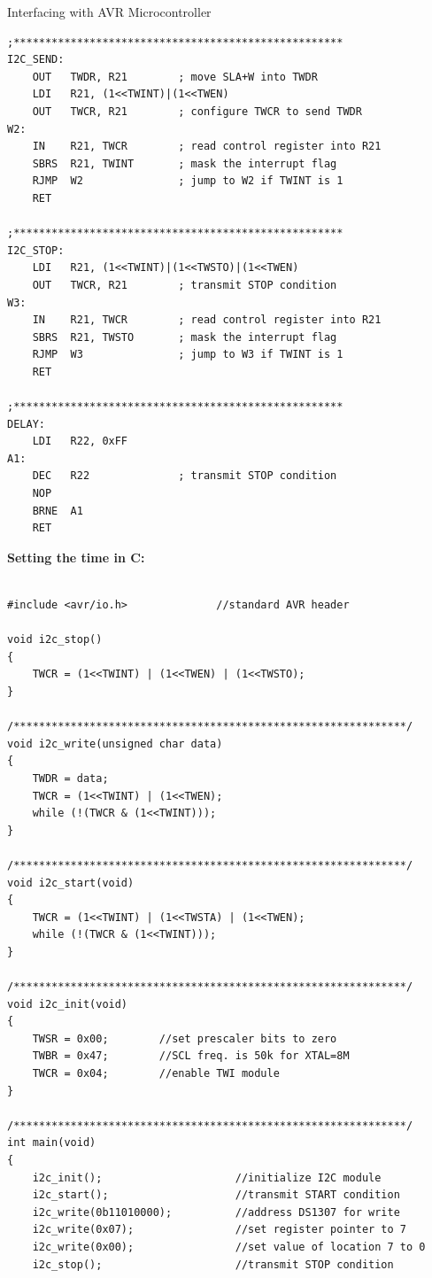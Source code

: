 \documentclass[11pt]{beamer}
\begin{document}
\begin{frame}{Interfacing with AVR Microcontroller}
\begin{verbatim}
;****************************************************
I2C_SEND:
    OUT   TWDR, R21        ; move SLA+W into TWDR
    LDI   R21, (1<<TWINT)|(1<<TWEN)
    OUT   TWCR, R21        ; configure TWCR to send TWDR
W2:
    IN    R21, TWCR        ; read control register into R21
    SBRS  R21, TWINT       ; mask the interrupt flag
    RJMP  W2               ; jump to W2 if TWINT is 1
    RET

;****************************************************
I2C_STOP:
    LDI   R21, (1<<TWINT)|(1<<TWSTO)|(1<<TWEN)
    OUT   TWCR, R21        ; transmit STOP condition
W3:
    IN    R21, TWCR        ; read control register into R21
    SBRS  R21, TWSTO       ; mask the interrupt flag
    RJMP  W3               ; jump to W3 if TWINT is 1
    RET

;****************************************************
DELAY:
    LDI   R22, 0xFF
A1:
    DEC   R22              ; transmit STOP condition
    NOP
    BRNE  A1
    RET
        \end{verbatim}

        \framebreak

        \textbf{\large Setting the time in C:}
        \\~\\
        \begin{verbatim}
#include <avr/io.h>              //standard AVR header

void i2c_stop()
{
    TWCR = (1<<TWINT) | (1<<TWEN) | (1<<TWSTO);
}

/**************************************************************/
void i2c_write(unsigned char data)
{
    TWDR = data;
    TWCR = (1<<TWINT) | (1<<TWEN);
    while (!(TWCR & (1<<TWINT)));
}

/**************************************************************/
void i2c_start(void)
{
    TWCR = (1<<TWINT) | (1<<TWSTA) | (1<<TWEN);
    while (!(TWCR & (1<<TWINT)));
}

/**************************************************************/
void i2c_init(void)
{
    TWSR = 0x00;        //set prescaler bits to zero
    TWBR = 0x47;        //SCL freq. is 50k for XTAL=8M
    TWCR = 0x04;        //enable TWI module
}

/**************************************************************/
int main(void)
{
    i2c_init();                     //initialize I2C module
    i2c_start();                    //transmit START condition
    i2c_write(0b11010000);          //address DS1307 for write
    i2c_write(0x07);                //set register pointer to 7
    i2c_write(0x00);                //set value of location 7 to 0
    i2c_stop();                     //transmit STOP condition


\end{verbatim}
\end{frame}
\end{document}
